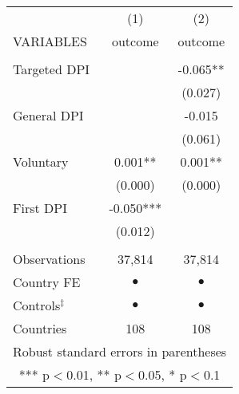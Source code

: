 \begin{tabular}{lcc} \hline
 & (1) & (2) \\
VARIABLES & outcome & outcome \\ \hline
 &  &  \\
Targeted DPI &  & -0.065** \\
 &  & (0.027) \\
General DPI &  & -0.015 \\
 &  & (0.061) \\
Voluntary & 0.001** & 0.001** \\
 & (0.000) & (0.000) \\
First DPI & -0.050*** &  \\
 & (0.012) &  \\
 &  &  \\
Observations & 37,814 & 37,814 \\
Country FE & $ \bullet $ & $ \bullet $ \\
Controls$^\ddag$ & $ \bullet $ & $ \bullet $ \\
 Countries & 108 & 108 \\ \hline
\multicolumn{3}{c}{ Robust standard errors in parentheses} \\
\multicolumn{3}{c}{ *** p$<$0.01, ** p$<$0.05, * p$<$0.1} \\
\end{tabular}
